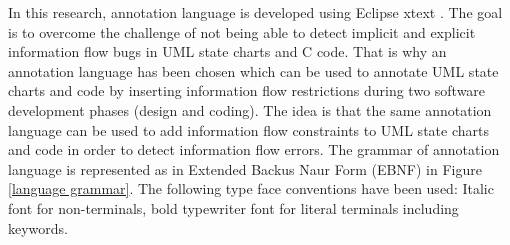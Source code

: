 In this research, annotation language is developed using Eclipse xtext \cite{ref_17_xtext:grammar}. The goal is to overcome the challenge of not being able to detect implicit and explicit information flow bugs in UML state charts and C code. That is why an annotation language has been chosen
which can be used to annotate UML state charts and code by inserting information flow
restrictions during two software development phases (design
and coding). The idea is that the same annotation language
can be used to add information flow constraints to UML state
charts and code in order to detect information flow errors. The grammar of annotation language is represented as in Extended Backus Naur Form (EBNF) in Figure \ref{language grammar}. The following type face conventions have been used: Italic font for non-terminals, bold typewriter font for literal terminals including keywords.
 
